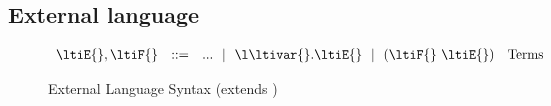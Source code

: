 \subsection{External language}

\begin{figure}
$$
\begin{array}{lrll}
  \ltiE{}, \ltiF{} &::=& ... \alt \ltiufun{\ltivar{}}{\ltiE{}}
                         \alt \ltiapp{\ltiF{}}{\ltiE{}}
                      &\mbox{Terms} 
\end{array}
$$
\caption{External Language Syntax
  (extends )
  }
\label{symbolic:figure:external-language-syntax}
\end{figure}

